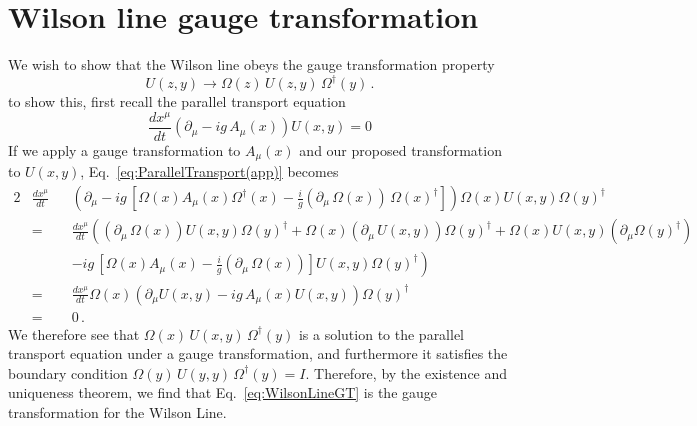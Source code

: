 \chapter{Wilson line gauge transformation}\label{app:WilsonLineGT}
We wish to show that the Wilson line obeys the gauge transformation property
%
\begin{equation}
U(z,y)\rightarrow \Omega(z)\,U(z,y)\,\Omega^\dagger(y)\, .
\label{eq:WilsonLineGT}
\end{equation}
%
to show this, first recall the parallel transport equation
%
\begin{equation}
\frac{dx^\mu}{dt}\left(\partial_\mu -ig\,A_\mu(x)\right)U(x,y)=0
\label{eq:ParallelTransport(app)}
\end{equation}
%
If we apply a gauge transformation to $A_\mu(x)$ and our proposed transformation to $U(x,y)$, Eq.~\ref{eq:ParallelTransport(app)} becomes
%
\begin{alignat*}{2}
&\frac{dx^\mu}{dt} && \left(\partial_\mu -ig\,\left[ \Omega(x)A_\mu(x)\Omega^\dagger(x) -\frac{i}{g}(\partial_\mu \, \Omega(x))\,\Omega(x)^\dagger\right]\right)\Omega(x) U(x,y)\Omega(y)^\dagger\\
&=&&\frac{dx^\mu}{dt}\left((\partial_\mu\,\Omega(x))U(x,y)\Omega(y)^\dagger + \Omega(x)(\partial_\mu\,U(x,y))\Omega(y)^\dagger + \Omega(x)U(x,y)(\partial_\mu \Omega(y)^\dagger) \right.\\
& &&\left.-ig\,\left[ \Omega(x)A_\mu(x)-\frac{i}{g}(\partial_\mu \, \Omega(x))\right]U(x,y)\Omega(y)^\dagger\right)\\
&=&& \frac{dx^\mu}{dt}\Omega(x)(\partial_\mu U(x,y) - ig\,A_\mu(x)U(x,y))\Omega(y)^\dagger\\
&=&& 0\, .
\end{alignat*}
We therefore see that $\Omega(x)\,U(x,y)\,\Omega^\dagger(y)$ is a solution to the parallel transport equation under a gauge transformation, and furthermore it satisfies the boundary condition $\Omega(y)\,U(y,y)\,\Omega^\dagger(y)=I$. Therefore, by the existence and uniqueness theorem, we find that Eq.~\ref{eq:WilsonLineGT} is the gauge transformation for the Wilson Line. 
